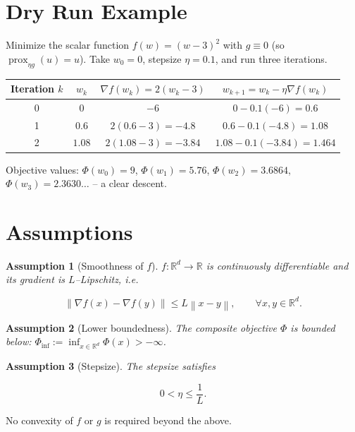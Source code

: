 \documentclass{article}
\newtheorem{assumption}{Assumption}
\newcommand{\prox}{\operatorname{prox}}
\newcommand{\grad}{\nabla}
\newcommand{\R}{\mathbb{R}}
\newcommand{\norm}[1]{\left\|#1\right\|}
\begin{document}
\section*{Dry Run Example}
Minimize the scalar function $f(w)=(w-3)^2$ with $g\equiv0$ (so $\prox_{\eta g}(u)=u$).  
Take $w_0=0$, stepsize $\eta=0.1$, and run three iterations.

\begin{center}
\begin{tabular}{c|c|c|c}
Iteration $k$ & $w_k$ & $\grad f(w_k)=2(w_k-3)$ & $w_{k+1}=w_k-\eta\grad f(w_k)$\\ \hline
0 & $0$ & $-6$ & $0-0.1(-6)=0.6$ \\
1 & $0.6$ & $2(0.6-3)=-4.8$ & $0.6-0.1(-4.8)=1.08$ \\
2 & $1.08$ & $2(1.08-3)=-3.84$ & $1.08-0.1(-3.84)=1.464$ 
\end{tabular}
\end{center}

Objective values: $\Phi(w_0)=9$, $\Phi(w_1)=5.76$, $\Phi(w_2)=3.6864$, $\Phi(w_3)=2.3630\ldots$ – a clear descent.

\newpage
\section*{Assumptions}
\begin{assumption}[Smoothness of $f$]\label{as:smooth}
$f:\R^{d}\to\R$ is continuously differentiable and its gradient is $L$–Lipschitz, i.e.  

\[
\norm{\grad f(x)-\grad f(y)}\le L\norm{x-y},\qquad\forall x,y\in\R^{d}.
\tag{A1}
\]
\end{assumption}

\begin{assumption}[Lower boundedness]\label{as:lb}
The composite objective $\Phi$ is bounded below: $\Phi_{\inf}:=\inf_{x\in\R^{d}}\Phi(x)>-\infty$.
\end{assumption}

\begin{assumption}[Stepsize]\label{as:stepsize}
The stepsize satisfies  

\[
0<\eta\le \frac{1}{L}.
\tag{A3}
\]
\end{assumption}

No convexity of $f$ or $g$ is required beyond the above.
\end{document}
